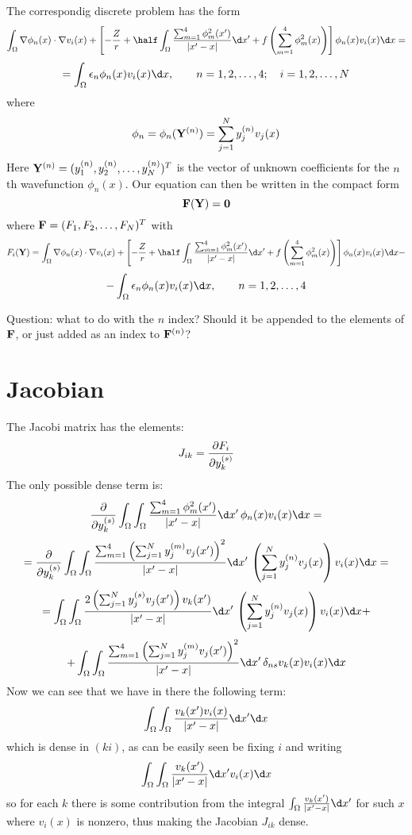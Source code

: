 \documentclass[11pt]{article}
\begin{document}
The correspondig discrete problem has the form
$$
\int_\Omega \nabla\phi_n(x)\cdot\nabla v_i(x)+\left[
-{Z\over r}+
\half \int_\Omega {
\sum_{m=1}^4 \phi_m^2(x')
\over|x' - x|}\d x'
+f\left( \sum_{m=1}^4\phi_m^2(x) \right)
\right]
\phi_n(x) v_i(x)  \d x=
$$
$$
=\int_\Omega
\epsilon_n\phi_n(x) v_i(x) \d x,\quad\quad n = 1, 2, \dots, 4;\quad
i = 1, 2, \dots, N
$$
where
$$\phi_n = \phi_n({\bf Y}^{(n)}) = \sum_{j=1}^N y_j^{(n)} v_j(x)$$
Here ${\bf Y}^{(n)} = (y_1^{(n)}, y_2^{(n)}, \dots, y_N^{(n)})^T$ is the vector
of unknown coefficients for the $n$th wavefunction $\phi_n(x)$. Our equation
can then be written in the compact form
$${\bf F}({\bf Y}) = {\bf 0}$$
where ${\bf F} = (F_1, F_2, \dots, F_N)^T$ with
$$F_i({\bf Y}) =
\int_\Omega \nabla\phi_n(x)\cdot\nabla v_i(x)+\left[
-{Z\over r}+
\half \int_\Omega {
\sum_{m=1}^4 \phi_m^2(x')
\over|x' - x|}\d x'
+f\left( \sum_{m=1}^4\phi_m^2(x) \right)
\right]
\phi_n(x) v_i(x)  \d x-
$$
$$
-\int_\Omega
\epsilon_n\phi_n(x) v_i(x) \d x,\quad\quad n = 1, 2, \dots, 4
$$

Question: what to do with the $n$ index? Should it be appended to the elements
of ${\bf F}$, or just added as an index to ${\bf F}^{(n)}$?

\section{Jacobian}

The Jacobi matrix has the elements:
$$J_{ik} = {\partial F_i\over\partial y_k^{(s)}}$$
The only possible dense term is:
$$
{\partial\over\partial y_k^{(s)}}\int_\Omega \int_\Omega {
\sum_{m=1}^4 \phi_m^2(x')
\over|x' - x|}\d x'\,\phi_n(x) v_i(x) \d x =
$$
$$
=
{\partial\over\partial y_k^{(s)}}\int_\Omega \int_\Omega {
\sum_{m=1}^4 \left(\sum_{j=1}^N y_j^{(m)} v_j(x')\right)^2
\over|x' - x|}\d x'\, \left(\sum_{j=1}^N y_j^{(n)} v_j(x)\right)  v_i(x) \d x =
$$
$$
=
\int_\Omega \int_\Omega {
2 \left(\sum_{j=1}^N y_j^{(s)} v_j(x')\right)v_k(x')
\over|x' - x|}\d x'\, \left(\sum_{j=1}^N y_j^{(n)} v_j(x)\right)  v_i(x) \d x +
$$
$$+
\int_\Omega \int_\Omega {
\sum_{m=1}^4 \left(\sum_{j=1}^N y_j^{(m)} v_j(x')\right)^2
\over|x' - x|}\d x'\, \delta_{ns}v_k(x)  v_i(x) \d x
$$
Now we can see that we have in there the following term:
$$
\int_\Omega \int_\Omega {v_k(x') v_i(x)\over |x'-x|}\d x'\d x
$$
which is dense in $(ki)$, as can be easily seen be fixing $i$ and writing
$$
\int_\Omega \int_\Omega {v_k(x')\over |x'-x|}\d x' v_i(x)\d x
$$
so for each $k$ there is some contribution from the integral $ \int_\Omega
{v_k(x')\over |x'-x|}\d x' $ for such $x$ where $v_i(x)$ is nonzero, thus
making the Jacobian $J_{ik}$ dense.
\end{document}
